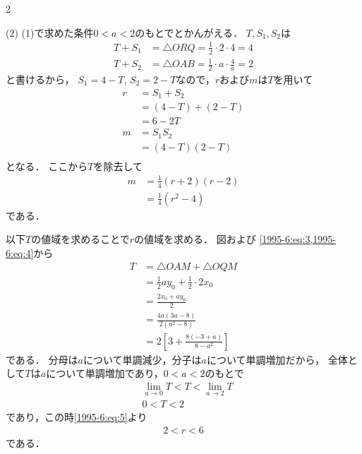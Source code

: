\documentclass[../../../../main.tex]{subfiles}
\begin{document}
\begin{multicols}{2}
    \vspace{10pt}


    (2)
    (1)で求めた条件$0<a<2$のもとでとかんがえる．
    $T,S_1,S_2$は
    \begin{align*}
        T+S_1 & = \triangle ORQ = \frac{1}{2} \cdot 2 \cdot 4 = 4           \\
        T+S_2 & = \triangle OAB = \frac{1}{2} \cdot a \cdot \frac{4}{a} = 2
    \end{align*}
    と書けるから，
    $S_1 = 4-T$, $S_2 = 2-T$なので，$r$および$m$は$T$を用いて
    \begin{align}
        r
         & = S_1+S_2                     \\
         & = (4-T)+(2-T)                 \\
         & = 6-2T    \label{1995-6:eq:5} \\
        m
         & = S_1S_2                      \\
         & = (4-T)(2-T)                  \\
    \end{align}
    となる．
    ここから$T$を除去して
    \begin{align}
        m
         & = \frac{1}{4}(r+2)(r-2)                  \\
         & = \frac{1}{4}(r^2-4) \label{1995-6:eq:6}
    \end{align}
    である．

    以下$T$の値域を求めることで$r$の値域を求める．
    図および \cref{1995-6:eq:3,1995-6:eq:4}から
    \begin{align*}
        T
         & = \triangle OAM + \triangle OQM              \\
         & = \frac{1}{2}a y_0 + \frac{1}{2} \cdot 2 x_0 \\
         & = \frac{2 x_0 + ay_0 }{2}                    \\
         & = \frac{4a(3a-8)}{2(a^2-8)}                  \\
         & = 2\left[3 + \frac{8(-3+a)}{8-a^2}\right]
    \end{align*}
    である．
    分母は$a$について単調減少，分子は$a$について単調増加だから，
    全体として$T$は$a$について単調増加であり，$0<a<2$のもとで
    \begin{align*}
         & \lim_{a\to 0}T <T <\lim_{a\to 2} T \\
         & 0<T<2
    \end{align*}
    であり，この時\cref{1995-6:eq:5}より
    \begin{align}
        2<r<6 \label{1995-6:eq:7}
    \end{align}
    である．


\end{multicols}
\end{document}
